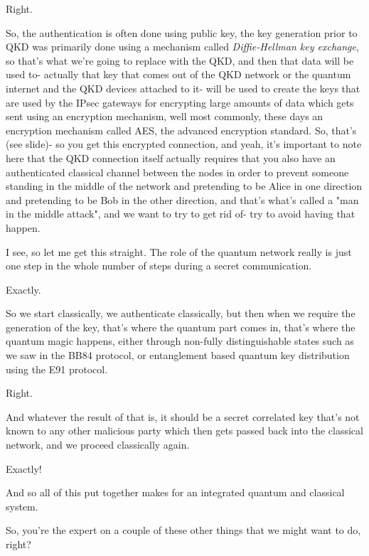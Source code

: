 \mmm Right.

\rrr So, the authentication is often done using public key, the key generation prior to QKD was primarily done using a mechanism called \emph{Diffie-Hellman key exchange}, so that's what we're going to replace with the QKD, and then that data will be used to- actually that key that comes out of the QKD network or the quantum internet and the QKD devices attached to it- will be used to create the keys that are used by the IPsec gateways for encrypting large amounts of data which gets sent using an encryption mechanism, well most commonly, these days an encryption mechanism called AES, the advanced encryption standard. So, that's (see slide)- so you get this encrypted connection, and yeah, it's important to note here that the QKD connection itself actually requires that you also have an authenticated classical channel between the nodes in order to prevent someone standing in the middle of the network and pretending to be Alice in one direction and pretending to be Bob in the other direction, and that's what's called a "man in the middle attack", and we want to try to get rid of- try to avoid having that happen.

\mmm I see, so let me get this straight. The role of the quantum network really is just one step in the whole number of steps during a secret communication.

\rrr Exactly.

\mmm So we start classically, we authenticate classically, but then when we require the generation of the key, that's where the quantum part comes in, that's where the quantum magic happens, either through non-fully distinguishable states such as we saw in the BB84 protocol, or entanglement based quantum key distribution using the E91 protocol.

\rrr Right.

\mmm And whatever the result of that is, it should be a secret correlated key that's not known to any other malicious party which then gets passed back into the classical network, and we proceed classically again.

\rrr Exactly! 

And so all of this put together makes for an integrated quantum and classical system.

So, you're the expert on a couple of these other things that we might want to do, right?

